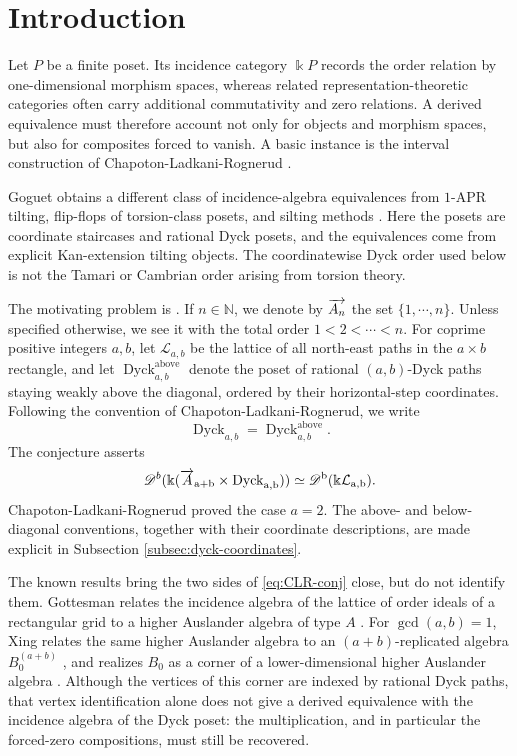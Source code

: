 \documentclass[12pt,a4paper,english,reqno]{amsart}
\theoremstyle{plain}
\theoremstyle{definition}
\newcommand{\kk}{\Bbbk}
\newcommand{\Dyck}{\operatorname{Dyck}}
\newcommand{\Db}[1]{{\mathscr D}^b(#1)}
\newcommand{\ovr}{\rm \overrightarrow}
\begin{document}
\section{Introduction}
Let $P$ be a finite poset.  Its incidence category $\kk P$ records the
order relation by one-dimensional morphism spaces, whereas related
representation-theoretic categories often carry additional commutativity and
zero relations.  A derived equivalence must therefore account not only for
objects and morphism spaces, but also for composites forced to vanish.  A
basic instance is the interval construction of Chapoton-Ladkani-Rognerud
\cite{CLR}.

Goguet obtains a different class of incidence-algebra equivalences from
$1$-APR tilting, flip-flops of torsion-class posets, and silting methods
\cite[Theorems~1 and~2]{Goguet}.  Here the posets are coordinate staircases
and rational Dyck posets, and the equivalences come from explicit
Kan-extension tilting objects.  The coordinatewise Dyck order used below is
not the Tamari or Cambrian order arising from torsion theory.

The motivating problem is \cite[Conjecture~3.7]{CLR}. If $n\in\mathbb N$, we denote by $\ovr{A_n}$ the set $\{1,\cdots ,n\}$. Unless specified otherwise, we see it with
the total order $1 <2 < \cdots < n$. For coprime
positive integers $a,b$, let $\mathcal L_{a,b}$ be the lattice of all north-east
paths in the $a\times b$ rectangle, and let 
$\Dyck^{\mathrm{above}}_{a,b}$ denote the poset of rational
$(a,b)$-Dyck paths staying weakly above the diagonal, ordered by their
horizontal-step coordinates.  Following the convention of
Chapoton-Ladkani-Rognerud, we write
\[
\Dyck_{a,b}
=
\Dyck^{\mathrm{above}}_{a,b}.
\]
The conjecture asserts
\begin{equation}
 \Db{\kk(\ovr A_{a+b}\times\Dyck_{a,b})} \simeq \Db{\kk \mathcal L_{a,b}}.
\label{eq:CLR-conj}
\end{equation}
Chapoton-Ladkani-Rognerud proved the case $a=2$.  The above- and
below-diagonal conventions, together with their coordinate descriptions, are
made explicit in Subsection \ref{subsec:dyck-coordinates}.

The known results bring the two sides of \eqref{eq:CLR-conj} close, but do not
identify them.  Gottesman relates the incidence algebra of the lattice of
order ideals of a rectangular grid to a higher Auslander algebra of type
$A$ \cite[Theorem~E]{Gottesman}.  For $\gcd(a,b)=1$, Xing relates the same
higher Auslander algebra to an $(a+b)$-replicated algebra $B_0^{(a+b)}$
\cite[Theorem~4.5 and Proposition~4.25]{Xing}, and realizes $B_0$ as a corner
of a lower-dimensional higher Auslander algebra
\cite[Proposition~4.33]{Xing}.  Although the vertices of this corner are
indexed by rational Dyck paths, that vertex identification alone does not
give a derived equivalence with the incidence algebra of the Dyck poset: the
multiplication, and in particular the forced-zero compositions, must still
be recovered.
\end{document}
